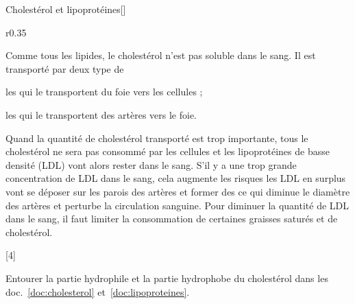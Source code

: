 \begin{doc}{Cholestérol et lipoprotéines}[\label{doc:lipoproteines}]
  \begin{wrapfigure}[15]{r}{0.35\linewidth}
    \vspace*{-34pt}
    \centering

  \end{wrapfigure}
  
  Comme tous les lipides, le cholestérol n'est pas soluble dans le sang.
  Il est transporté par deux type de 
  \begin{listePoints}
    \item les  qui le transportent du foie vers les cellules ;
    \item les  qui le transportent des artères vers le foie.
  \end{listePoints}

  Quand la quantité de cholestérol transporté est trop importante, tous le cholestérol ne sera pas consommé par les cellules et les lipoprotéines de basse densité (LDL) vont alors rester dans le sang.
  S'il y a une trop grande concentration de LDL dans le sang, cela augmente les risques  les LDL en surplus vont se déposer sur les parois des artères et former des  ce qui diminue le diamètre des artères et perturbe la circulation sanguine.
  Pour diminuer la quantité de LDL dans le sang, il faut limiter la consommation de certaines graisses saturés et de cholestérol.
\end{doc}

[4]

\schematisation
Entourer la partie hydrophile et la partie hydrophobe du cholestérol dans les doc.~\ref{doc:cholesterol} et~\ref{doc:lipoproteines}.